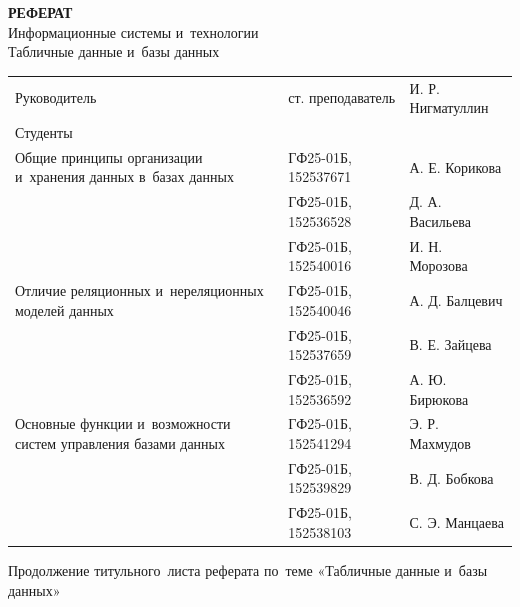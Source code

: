 \documentclass{ou}
\begin{document}
\thispagestyle{empty}
\begin{center}
\shortstack{\FGAVO}\vspace{4\baselineskip}
\textbf{РЕФЕРАТ}\\
Информационные системы и~технологии\\
Табличные данные и~базы данных\vspace{2\baselineskip}\end{center}
\begin{flushleft}
\doublespacing
\begin{tabularx}{\textwidth}{@{} p{} l l @{}}
Руководитель & ст. преподаватель & И. Р. Нигматуллин\\
Студенты     &                   &                  \\
\multirow{-2.27}{\hsize}{\singlespacing Общие принципы организации и~хранения данных в~базах данных}
             & ГФ25-01Б, 152537671 & А. Е. Корикова\\
             & ГФ25-01Б, 152536528 & Д. А. Васильева\\
             & ГФ25-01Б, 152540016 & И. Н. Морозова\\
\multirow{-2.27}{\hsize}{\singlespacing Отличие реляционных и~нереляционных моделей данных}
             & ГФ25-01Б, 152540046 & А. Д. Балцевич\\
             & ГФ25-01Б, 152537659 & В. Е. Зайцева\\
             & ГФ25-01Б, 152536592 & А. Ю. Бирюкова\\
\multirow{-2.27}{\hsize}{\singlespacing Основные функции и~возможности систем управления базами данных}
             & ГФ25-01Б, 152541294 & Э. Р. Махмудов\\
             & ГФ25-01Б, 152539829 & В. Д. Бобкова\\
             & ГФ25-01Б, 152538103 & С. Э. Манцаева\\
\end{tabularx}
\end{flushleft}
\vspace*{\fill}
\begin{center}
\city
\end{center}
\newpage
\thispagestyle{empty}
Продолжение титульного~листа реферата по~теме «Табличные данные и~базы данных»
\end{document}
